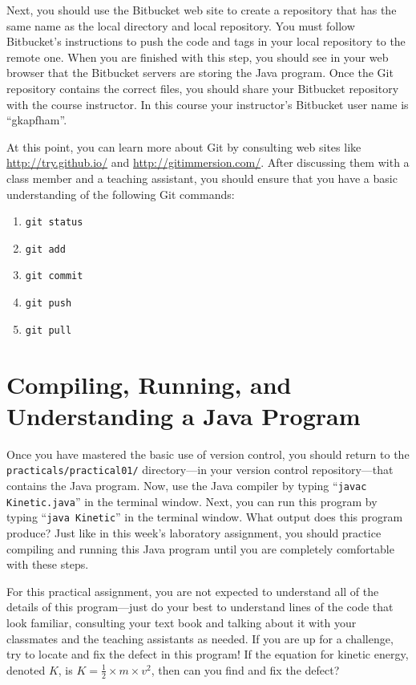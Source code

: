 Next, you should use the Bitbucket web site to create a repository that has the same name as the local directory and
local repository.  You must follow Bitbucket's instructions to push the code and tags in your local repository to the
remote one. When you are finished with this step, you should see in your web browser that the Bitbucket servers are
storing the Java program. Once the Git repository contains the correct files, you should share your Bitbucket repository
with the course instructor. In this course your instructor's Bitbucket user name is ``gkapfham''.

At this point, you can learn more about Git by consulting web sites like \url{http://try.github.io/} and
\url{http://gitimmersion.com/}.  After discussing them with a class member and a teaching assistant, you should ensure
that you have a basic understanding of the following Git commands:

\vspace*{-.125in}
\begin{enumerate}
  \setlength{\itemsep}{-.03in}
  \item {\tt git status}
  \item {\tt git add}
  \item {\tt git commit}
  \item {\tt git push}
  \item {\tt git pull}
\end{enumerate}
\vspace*{-.15in}

\section*{Compiling, Running, and Understanding a Java Program}

Once you have mastered the basic use of version control, you should return to the \\ {\tt practicals/practical01/}
directory---in your version control repository---that contains the Java program. Now, use the Java compiler by typing
``{\tt javac Kinetic.java}'' in the terminal window.  Next, you can run this program by typing ``{\tt java Kinetic}'' in
the terminal window.  What output does this program produce?  Just like in this week's laboratory assignment, you should
practice compiling and running this Java program until you are completely comfortable with these steps.

For this practical assignment, you are not expected to understand all of the details of this program---just do your best
to understand lines of the code that look familiar, consulting your text book and talking about it with your classmates
and the teaching assistants as needed. If you are up for a challenge, try to locate and fix the defect in this program!
If the equation for kinetic energy, denoted $K$, is $K=\frac{1}{2} \times m \times v^2$, then can you find and fix the
defect?

